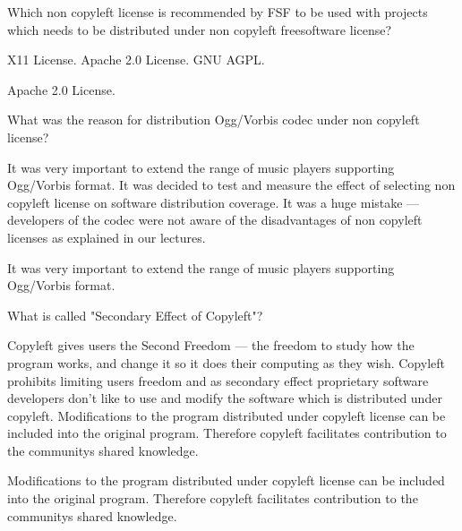 \begin{question}[type=exam]
Which non copyleft license is recommended by FSF to be used with projects which needs to be distributed under non copyleft freesoftware license?
\begin{itemize}
\chk X11 License.
\chk Apache 2.0 License.
\chk GNU AGPL.
\end{itemize}
\end{question}
\begin{solution}
Apache 2.0 License.
\end{solution}


\begin{question}[type=exam]
What was the reason for distribution Ogg/Vorbis codec under non copyleft license?
\begin{itemize}
\chk It was very important to extend the range of music players supporting Ogg/Vorbis format.
\chk It was decided to test and measure the effect of selecting non copyleft license on software distribution coverage.
\chk It was a huge mistake --- developers of the codec were not aware of the disadvantages of non copyleft licenses as explained in our lectures.
\end{itemize}
\end{question}
\begin{solution}
It was very important to extend the range of music players supporting Ogg/Vorbis format.
\end{solution}


\begin{question}[type=exam]
What is called "Secondary Effect of Copyleft"?
\begin{itemize}
\chk Copyleft gives users the Second Freedom --- the freedom to study how the program works, and change it so it does their computing as they wish.
\chk Copyleft prohibits limiting users freedom and as secondary effect proprietary software developers don't like to use and modify the software which is distributed under copyleft.
\chk Modifications to the program distributed under copyleft license can be included into the original program. Therefore copyleft facilitates contribution to the communitys shared knowledge.
\end{itemize}
\end{question}
\begin{solution}
Modifications to the program distributed under copyleft license can be included into the original program. Therefore copyleft facilitates contribution to the communitys shared knowledge.
\end{solution}


